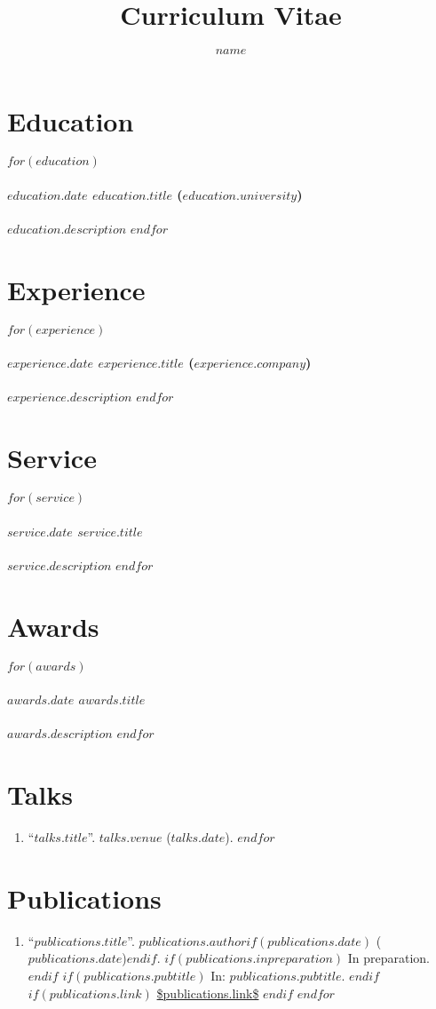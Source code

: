 \documentclass[11pt]{article}
\title{Curriculum Vitae}
\author{$name$}
\begin{document}
\maketitle

\section*{Education}
$for(education)$
\paragraph{$education.date$ $education.title$ ($education.university$)}
$education.description$
$endfor$

\section*{Experience}
$for(experience)$
\paragraph{$experience.date$ $experience.title$ ($experience.company$)}
$experience.description$
$endfor$

\section*{Service}
$for(service)$
\paragraph{$service.date$ $service.title$}
$service.description$
$endfor$

\section*{Awards}
$for(awards)$
\paragraph{$awards.date$ $awards.title$}
$awards.description$
$endfor$

\section*{Talks}
\begin{enumerate}
$for(talks)$
\item ``\href{$talks.link$}{$talks.title$}''. $talks.venue$ ($talks.date$).
$endfor$
\end{enumerate}

\section*{Publications}
\begin{enumerate}
$for(publications)$
\item ``\href{$publications.link$}{$publications.title$}''. $publications.author$$if(publications.date)$ ($publications.date$)$endif$.
$if(publications.inpreparation)$
In preparation.
$endif$
$if(publications.pubtitle)$
In: \emph{$publications.pubtitle$}.
$endif$
$if(publications.link)$
\url{$publications.link$}
$endif$
$endfor$
\end{enumerate}
\end{document}
